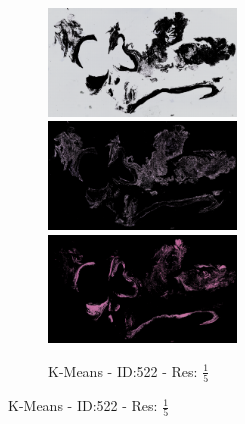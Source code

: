 \documentclass[a4paper,10pt,oneside]{article}
\begin{document}
\begin{figure}[hbtp]
\begin{subfigure}[b]{5cm}
    \includegraphics[width=5cm]{visualization/results/kmeans/res_reduce_5/Region_0_PO13-00522A1_1_2_201305171639.png}
    \includegraphics[width=5cm]{visualization/results/kmeans/res_reduce_5/Region_2_PO13-00522A1_1_2_201305171639.png}
    \includegraphics[width=5cm]{visualization/results/kmeans/res_reduce_5/Region_1_PO13-00522A1_1_2_201305171639.png}
    \caption{K-Means - ID:522 - Res: $\frac{1}{5}$}
  \end{subfigure}
  

\end{figure}
\end{document}
